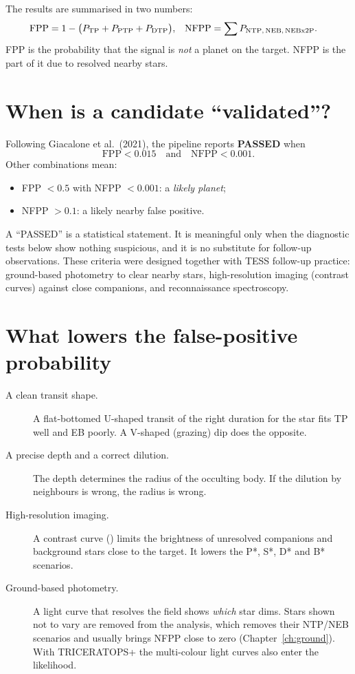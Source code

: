 \documentclass[11pt,a4paper]{report}
\newcommand{\code}[1]{\path{#1}}
\begin{document}
The results are summarised in two numbers:
\begin{align*}
\text{FPP} &= 1 - \big(P_{\rm TP} + P_{\rm PTP} + P_{\rm DTP}\big), &
\text{NFPP} &= \sum P_{\rm NTP,\,NEB,\,NEBx2P}.
\end{align*}
FPP is the probability that the signal is \emph{not} a planet on the target.
NFPP is the part of it due to resolved nearby stars.

\section{When is a candidate ``validated''?}

Following Giacalone et al.\ (2021), the pipeline reports \textbf{PASSED} when
\[
\text{FPP} < 0.015 \quad\text{and}\quad \text{NFPP} < 0.001 .
\]
Other combinations mean:
\begin{itemize}
\item FPP $<0.5$ with NFPP $<0.001$: a \emph{likely planet};
\item NFPP $>0.1$: a likely nearby false positive.
\end{itemize}
A ``PASSED'' is a statistical statement. It is meaningful only when the
diagnostic tests below show nothing suspicious, and it is no substitute for
follow-up observations. These criteria were designed together with
TESS follow-up practice: ground-based photometry to clear nearby stars,
high-resolution imaging (contrast curves) against close companions, and
reconnaissance spectroscopy.

\section{What lowers the false-positive probability}

\begin{description}
\item[A clean transit shape.] A flat-bottomed U-shaped transit of the right
duration for the star fits TP well and EB poorly. A V-shaped (grazing)
dip does the opposite.
\item[A precise depth and a correct dilution.] The depth determines the
radius of the occulting body. If the dilution by neighbours is wrong, the
radius is wrong.
\item[High-resolution imaging.] A contrast curve
(\code{--contrast-curve}) limits the brightness of unresolved companions and
background stars close to the target. It lowers the P*, S*, D* and B*
scenarios.
\item[Ground-based photometry.] A light curve that resolves the field shows
\emph{which} star dims. Stars shown not to vary are removed from the
analysis, which removes their NTP/NEB scenarios and usually brings NFPP close
to zero (Chapter~\ref{ch:ground}). With TRICERATOPS+ the multi-colour light
curves also enter the likelihood.
\end{description}
\end{document}
